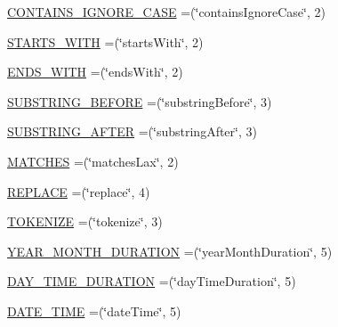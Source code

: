 \begin{DoxyCompactItemize}
\item 
\hyperlink{enumorg_1_1semanticweb_1_1owlapi_1_1vocab_1_1_s_w_r_l_built_ins_vocabulary_a4a51bd1cb34d2d20d302398a9e4436a3}{C\-O\-N\-T\-A\-I\-N\-S\-\_\-\-I\-G\-N\-O\-R\-E\-\_\-\-C\-A\-S\-E} =(\char`\"{}contains\-Ignore\-Case\char`\"{}, 2)
\item 
\hyperlink{enumorg_1_1semanticweb_1_1owlapi_1_1vocab_1_1_s_w_r_l_built_ins_vocabulary_a27898583fbebd3f76578bd29ff785698}{S\-T\-A\-R\-T\-S\-\_\-\-W\-I\-T\-H} =(\char`\"{}starts\-With\char`\"{}, 2)
\item 
\hyperlink{enumorg_1_1semanticweb_1_1owlapi_1_1vocab_1_1_s_w_r_l_built_ins_vocabulary_a43a73d4146020b6d50536dca228239c7}{E\-N\-D\-S\-\_\-\-W\-I\-T\-H} =(\char`\"{}ends\-With\char`\"{}, 2)
\item 
\hyperlink{enumorg_1_1semanticweb_1_1owlapi_1_1vocab_1_1_s_w_r_l_built_ins_vocabulary_abbed061b050dd30db3788ab1adecf971}{S\-U\-B\-S\-T\-R\-I\-N\-G\-\_\-\-B\-E\-F\-O\-R\-E} =(\char`\"{}substring\-Before\char`\"{}, 3)
\item 
\hyperlink{enumorg_1_1semanticweb_1_1owlapi_1_1vocab_1_1_s_w_r_l_built_ins_vocabulary_a8f6a72a456be424df78ef1f4642dc97b}{S\-U\-B\-S\-T\-R\-I\-N\-G\-\_\-\-A\-F\-T\-E\-R} =(\char`\"{}substring\-After\char`\"{}, 3)
\item 
\hyperlink{enumorg_1_1semanticweb_1_1owlapi_1_1vocab_1_1_s_w_r_l_built_ins_vocabulary_a1f5c94efde938bde76b6c2d9951d8766}{M\-A\-T\-C\-H\-E\-S} =(\char`\"{}matches\-Lax\char`\"{}, 2)
\item 
\hyperlink{enumorg_1_1semanticweb_1_1owlapi_1_1vocab_1_1_s_w_r_l_built_ins_vocabulary_ad185069ffc98e969281a5e3202bfbd74}{R\-E\-P\-L\-A\-C\-E} =(\char`\"{}replace\char`\"{}, 4)
\item 
\hyperlink{enumorg_1_1semanticweb_1_1owlapi_1_1vocab_1_1_s_w_r_l_built_ins_vocabulary_ad707f07b951da2f2613c3bc09ccfdab6}{T\-O\-K\-E\-N\-I\-Z\-E} =(\char`\"{}tokenize\char`\"{}, 3)
\item 
\hyperlink{enumorg_1_1semanticweb_1_1owlapi_1_1vocab_1_1_s_w_r_l_built_ins_vocabulary_a2bd0385ea17913f809360d8c741b9bc1}{Y\-E\-A\-R\-\_\-\-M\-O\-N\-T\-H\-\_\-\-D\-U\-R\-A\-T\-I\-O\-N} =(\char`\"{}year\-Month\-Duration\char`\"{}, 5)
\item 
\hyperlink{enumorg_1_1semanticweb_1_1owlapi_1_1vocab_1_1_s_w_r_l_built_ins_vocabulary_a544c579fa6b8cb524534d478ff5c3a10}{D\-A\-Y\-\_\-\-T\-I\-M\-E\-\_\-\-D\-U\-R\-A\-T\-I\-O\-N} =(\char`\"{}day\-Time\-Duration\char`\"{}, 5)
\item 
\hyperlink{enumorg_1_1semanticweb_1_1owlapi_1_1vocab_1_1_s_w_r_l_built_ins_vocabulary_acbc7c0b6d72a383bc93d71196de977c8}{D\-A\-T\-E\-\_\-\-T\-I\-M\-E} =(\char`\"{}date\-Time\char`\"{}, 5)

\end{DoxyCompactItemize}
